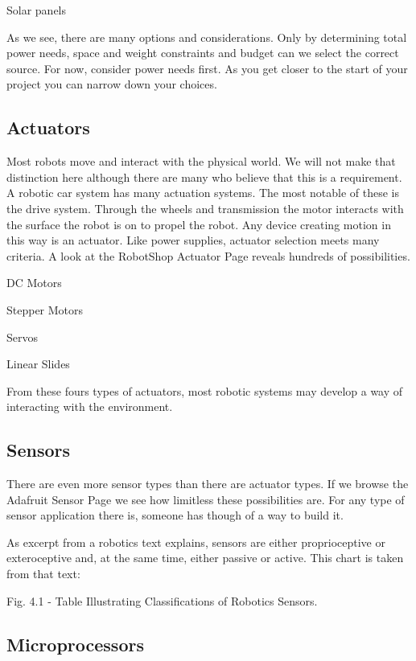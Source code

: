\documentclass[
]{book}
\begin{document}
Solar panels

As we see, there are many options and considerations. Only by determining total power needs, space and weight constraints and budget can we select the correct source. For now, consider power needs first. As you get closer to the start of your project you can narrow down your choices.

\hypertarget{actuators}{%
\subsection{Actuators}\label{actuators}}

Most robots move and interact with the physical world. We will not make that distinction here although there are many who believe that this is a requirement. A robotic car system has many actuation systems. The most notable of these is the drive system. Through the wheels and transmission the motor interacts with the surface the robot is on to propel the robot. Any device creating motion in this way is an actuator. Like power supplies, actuator selection meets many criteria. A look at the RobotShop Actuator Page reveals hundreds of possibilities.

DC Motors

Stepper Motors

Servos

Linear Slides

From these fours types of actuators, most robotic systems may develop a way of interacting with the environment.

\hypertarget{sensors}{%
\subsection{Sensors}\label{sensors}}

There are even more sensor types than there are actuator types. If we browse the Adafruit Sensor Page we see how limitless these possibilities are. For any type of sensor application there is, someone has though of a way to build it.

As excerpt from a robotics text explains, sensors are either proprioceptive or exteroceptive and, at the same time, either passive or active. This chart is taken from that text:

Fig. 4.1 - Table Illustrating Classifications of Robotics Sensors.

\hypertarget{microprocessors}{%
\subsection{Microprocessors}\label{microprocessors}}
\end{document}
